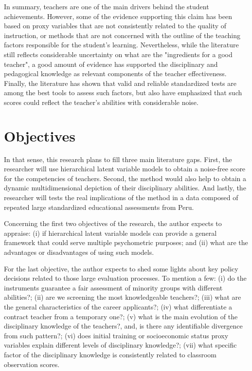 In summary, teachers are one of the main drivers behind the student achievements. However, some of the evidence supporting this claim has been based on proxy variables that are not consistently related to the quality of instruction, or methods that are not concerned with the outline of the teaching factors responsible for the student's learning. Nevertheless, while the literature still reflects considerable uncertainty on what are the "ingredients for a good teacher", a good amount of evidence has supported the disciplinary and pedagogical knowledge as relevant components of the teacher effectiveness. Finally, the literature has shown that valid and reliable standardized tests are among the best tools to assess such factors, but also have emphasized that such scores could reflect the teacher's abilities with considerable noise.

\section{Objectives}

In that sense, this research plans to fill three main literature gaps. First, the researcher will use hierarchical latent variable models to obtain a noise-free score for the competencies of teachers. Second, the method would also help to obtain a dynamic multidimensional depiction of their disciplinary abilities. And lastly, the researcher will tests the real implications of the method in a data composed of repeated large standardized educational assessments from Peru. 

Concerning the first two objectives of the research, the author expects to appraise: (i) if hierarchical latent variable models can provide a general framework that could serve multiple psychometric purposes; and (ii) what are the advantages or disadvantages of using such models.

For the last objective, the author expects to shed some lights about key policy decisions related to those large evaluation processes. To mention a few: (i) do the instruments guarantee a fair assessment of minority groups with different abilities?; (ii) are we screening the most knowledgeable teachers?; (iii) what are the general characteristics of the career applicants?; (iv) what differentiate a contract teacher from a temporary one?; (v) what is the main evolution of the disciplinary knowledge of the teachers?, and, is there any identifiable divergence from such pattern?; (vi) does initial training or socioeconomic status proxy variables explain different levels of disciplinary knowledge?; (vii) what specific factor of the disciplinary knowledge is consistently related to classroom observation scores.

